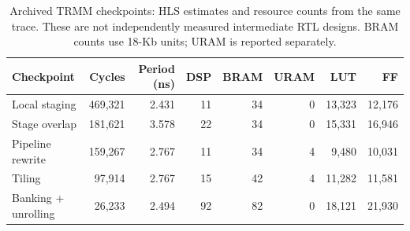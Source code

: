 \begin{table}[t]
\centering
\caption{Archived TRMM checkpoints: HLS estimates and resource counts from the same trace. These are not independently measured intermediate RTL designs. BRAM counts use 18-Kb units; URAM is reported separately.}
\label{tab:sigmetrics-trmm-resources}
\scriptsize
\setlength{\tabcolsep}{3pt}
\begin{tabularx}{\linewidth}{@{}Xrrrrrrr@{}}
\toprule
Checkpoint & Cycles & Period (ns) & DSP & BRAM & URAM & LUT & FF \\
\midrule
Local staging & 469,321 & 2.431 & 11 & 34 & 0 & 13,323 & 12,176 \\
Stage overlap & 181,621 & 3.578 & 22 & 34 & 0 & 15,331 & 16,946 \\
Pipeline rewrite & 159,267 & 2.767 & 11 & 34 & 4 & 9,480 & 10,031 \\
Tiling & 97,914 & 2.767 & 15 & 42 & 4 & 11,282 & 11,581 \\
Banking + unrolling & 26,233 & 2.494 & 92 & 82 & 0 & 18,121 & 21,930 \\
\bottomrule
\end{tabularx}
\end{table}
